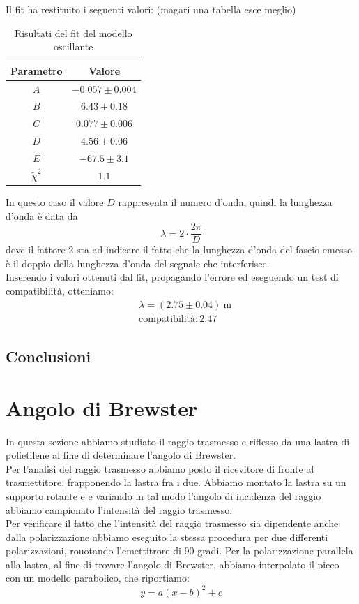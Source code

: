 \documentclass[letterpaper,12pt]{article}
\begin{document}
Il fit ha restituito i seguenti valori: (magari una tabella esce meglio)
\begin{table}[h!]
	\centering
	\begin{tabular}{|c|c|}
		\hline
		Parametro & Valore \\
		\hline
		$A$ & $-0.057 \pm 0.004$ \\
		$B$ & $6.43 \pm 0.18$ \\
		$C$ & $0.077 \pm 0.006$ \\
		$D$ & $4.56 \pm 0.06$ \\
		$E$ & $-67.5 \pm 3.1$ \\
		$\tilde\chi^2$ & $1.1$ \\
		\hline
	\end{tabular}
	\caption{Risultati del fit del modello oscillante}
	\label{tab:fit_distanza_ondulatori}
\end{table}

In questo caso il valore $D$ rappresenta il numero d'onda, quindi la lunghezza d'onda è data da
$$\lambda = 2\cdot \frac{2\pi}{D}$$
dove il fattore 2 sta ad indicare il fatto che la lunghezza d'onda del fascio emesso è il doppio della lunghezza d'onda del segnale che interferisce.\\
Inserendo i valori ottenuti dal fit, propagando l'errore ed eseguendo un test di compatibilità, otteniamo:
\begin{align*}
	 & \lambda = (2.75 \pm 0.04)\ \text{m} \\
	 & \text{compatibilità}: 2.47
\end{align*}

\subsection{Conclusioni}

\section{Angolo di Brewster}
In questa sezione abbiamo studiato il raggio trasmesso e riflesso da una lastra di polietilene al fine di determinare
l'angolo di Brewster.\\
Per l'analisi del raggio trasmesso abbiamo posto il ricevitore di fronte al trasmettitore, frapponendo la lastra
fra i due. Abbiamo montato la lastra su un supporto rotante e e variando in tal modo l'angolo di incidenza del raggio
abbiamo campionato l'intensità del raggio trasmesso.\\
Per verificare il fatto che l'intensità del raggio trasmesso sia dipendente anche dalla polarizzazione abbiamo
eseguito la stessa procedura per due differenti polarizzazioni, rouotando l'emettitrore di 90 gradi. Per la polarizzazione
parallela alla lastra, al fine di trovare l'angolo di Brewster, abbiamo interpolato il picco con un modello parabolico,
che riportiamo:
\begin{equation}
	y = a(x-b)^2 + c
	\label{eq:parabola}
\end{equation}
\\
\end{document}
